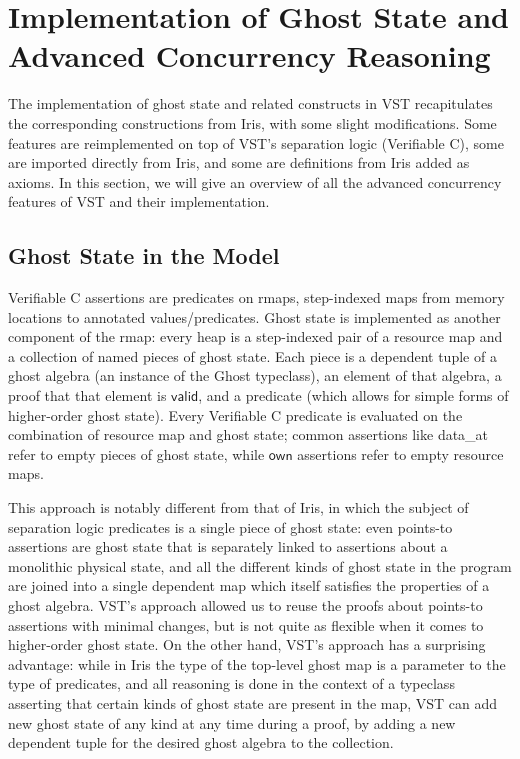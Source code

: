 \documentclass[11pt]{article}
\begin{document}
\section{Implementation of Ghost State and Advanced Concurrency Reasoning}
The implementation of ghost state and related constructs in VST recapitulates the corresponding constructions from Iris, with some slight modifications. Some features are reimplemented on top of VST's separation logic (Verifiable C), some are imported directly from Iris, and some are definitions from Iris added as axioms. In this section, we will give an overview of all the advanced concurrency features of VST and their implementation.

\subsection{Ghost State in the Model}
Verifiable C assertions are predicates on \textsf{rmap}s, step-indexed maps from memory locations to annotated values/predicates. Ghost state is implemented as another component of the \textsf{rmap}: every heap is a step-indexed pair of a resource map and a collection of named pieces of ghost state. Each piece is a dependent tuple of a ghost algebra (an instance of the \textsf{Ghost} typeclass), an element of that algebra, a proof that that element is $\mathsf{valid}$, and a predicate (which allows for simple forms of higher-order ghost state). Every Verifiable C predicate is evaluated on the combination of resource map and ghost state; common assertions like \textsf{data\_at} refer to empty pieces of ghost state, while $\mathsf{own}$ assertions refer to empty resource maps.

This approach is notably different from that of Iris, in which the subject of separation logic predicates is a single piece of ghost state: even points-to assertions are ghost state that is separately linked to assertions about a monolithic physical state, and all the different kinds of ghost state in the program are joined into a single dependent map which itself satisfies the properties of a ghost algebra. VST's approach allowed us to reuse the proofs about points-to assertions with minimal changes, but is not quite as flexible when it comes to higher-order ghost state. On the other hand, VST's approach has a surprising advantage: while in Iris the type of the top-level ghost map is a parameter to the type of predicates, and all reasoning is done in the context of a typeclass asserting that certain kinds of ghost state are present in the map, VST can add new ghost state of any kind at any time during a proof, by adding a new dependent tuple for the desired ghost algebra to the collection.
\end{document}
